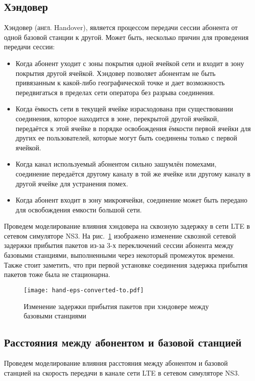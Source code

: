 \subsection{Хэндовер}  \label{handover_chapter2}
Хэндовер (англ. Handover), является процессом передачи сессии абонента от одной базовой станции к другой. Может быть, несколько причин для проведения передачи сессии:
\begin{itemize}
\item Когда абонент уходит с зоны покрытия одной ячейкой сети и входит в зону покрытия другой ячейкой. Хэндовер позволяет абонентам не быть привязанным к какой-либо географической точке и дает возможность передвигаться в пределах сети оператора без разрыва соединения.
\item Когда ёмкость сети в текущей ячейке израсходована при существовании соединения, которое находится в зоне, перекрытой другой ячейкой, передаётся к этой ячейке в порядке освобождения ёмкости первой ячейки для других ее пользователей, которые могут быть соединены только с первой ячейкой.
\item Когда канал используемый абонентом сильно зашумлён помехами, соединение передаётся другому каналу в той же ячейке или другому каналу в другой ячейке для устранения помех.
\item Когда абонент входит в зону микроячейки, соединение может быть передано для освобождения емкости большой сети.
\end{itemize}
Проведем моделирование влияния хэндовера на сквозную задержку в сети LTE в сетевом симуляторе NS3.
На рис. \ref{img:hand} изображено изменение сквозной сетевой задержки прибытия пакетов из-за 3-х переключений сессии абонента между базовыми станциями, выполненными через некоторый промежуток времени.
Также стоит заметить, что при первой установке соединения задержка прибытия пакетов тоже была не стационарна.
\begin{figure} [h]
  \center
\texttt{[image: hand-eps-converted-to.pdf]}
  \caption{Изменение задержки прибытия пакетов при хэндовере между базовыми станциями}
  \label{img:hand}
\end{figure}

\subsection{Расстояния между абонентом и базовой станцией}  \label{sect2_2_2}
Проведем моделирование влияния расстояния между абонентом и базовой станцией на скорость передачи в канале сети LTE в сетевом симуляторе NS3.



